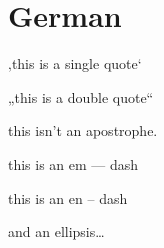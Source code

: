 
\def\mytitle{MultiMarkdown German Test}

\part{German}
\label{german}

‚this is a single quote`

„this is a double quote``

this isn't an apostrophe.

this is an em --- dash

this is an en -- dash

and an ellipsis{\ldots}




